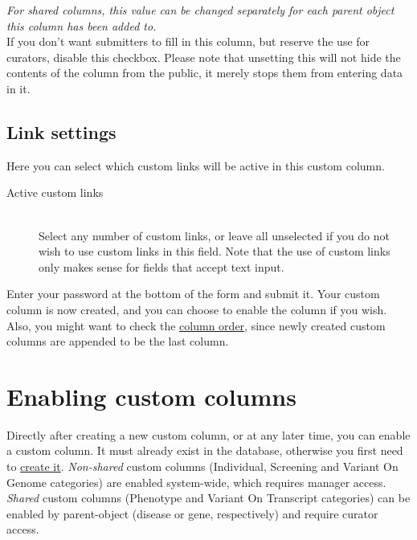 \begin{description}
  \emph{For shared columns, this value can be changed separately for each parent object this column has been added to.}
  \\
  If you don't want submitters to fill in this column, but reserve the use for curators, disable this checkbox.
  Please note that unsetting this will not hide the contents of the column from the public, it merely stops them from entering data in it.
\end{description}



\subsection{Link settings}
Here you can select which custom links will be active in this custom column.
\begin{description}
  \item[Active custom links] \hfill \\
  Select any number of custom links, or leave all unselected if you do not wish to use custom links in this field.
  Note that the use of custom links only makes sense for fields that accept text input.
\end{description}

\noindent
Enter your password at the bottom of the form and submit it.
Your custom column is now created, and you can choose to enable the column if you wish.
Also, you might want to check the \hyperlink{sec:columns_order}{column order}, since newly created custom columns are appended to be the last column.





\section{Enabling custom columns}
\label{sec:enabling_custom_columns}
Directly after creating a new custom column, or at any later time, you can enable a custom column.
It must already exist in the database, otherwise you first need to \hyperlink{sec:custom_column_create}{create it}.
\emph{Non-shared} custom columns (Individual, Screening and Variant On Genome categories) are enabled system-wide, which requires manager access.
\emph{Shared} custom columns (Phenotype and Variant On Transcript categories) can be enabled by parent-object (disease or gene, respectively) and require curator access.



